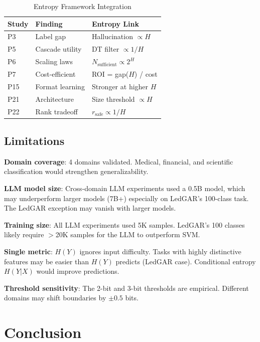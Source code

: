 \documentclass[review,3p]{elsarticle}
\begin{document}
\begin{table}[!ht]
\centering
\caption{Entropy Framework Integration}
\label{tab:integration}
\begin{tabular}{lll}
\toprule
\textbf{Study} & \textbf{Finding} & \textbf{Entropy Link} \\
\midrule
P3~\cite{p3} & Label gap & Hallucination $\propto H$ \\
P5~\cite{p5} & Cascade utility & DT filter $\propto 1/H$ \\
P6~\cite{p6} & Scaling laws & $N_\text{sufficient} \propto 2^H$ \\
P7~\cite{p7} & Cost-efficient & ROI = gap($H$) / cost \\
P15~\cite{p15} & Format learning & Stronger at higher $H$ \\
P21~\cite{p21} & Architecture & Size threshold $\propto H$ \\
P22~\cite{p22} & Rank tradeoff & $r_\text{safe} \propto 1/H$ \\
\bottomrule
\end{tabular}
\end{table}

\subsection{Limitations}
\textbf{Domain coverage}: 4 domains validated. Medical, financial, and scientific classification would strengthen generalizability.

\textbf{LLM model size}: Cross-domain LLM experiments used a 0.5B model, which may underperform larger models (7B+) especially on LedGAR's 100-class task. The LedGAR exception may vanish with larger models.

\textbf{Training size}: All LLM experiments used 5K samples. LedGAR's 100 classes likely require $>$20K samples for the LLM to outperform SVM.

\textbf{Single metric}: $H(Y)$ ignores input difficulty. Tasks with highly distinctive features may be easier than $H(Y)$ predicts (LedGAR case). Conditional entropy $H(Y|X)$ would improve predictions.

\textbf{Threshold sensitivity}: The 2-bit and 3-bit thresholds are empirical. Different domains may shift boundaries by $\pm 0.5$ bits.

\section{Conclusion}
\end{document}
